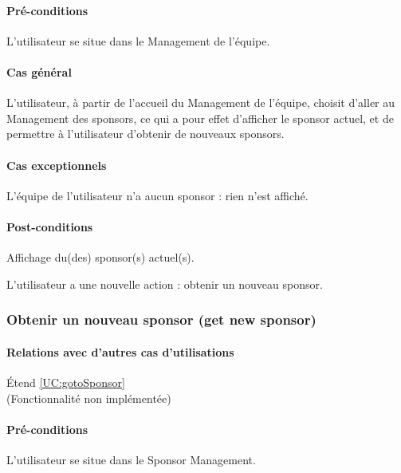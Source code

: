\paragraph{Pré-conditions}
\begin{list}{}{\leftmargin=1.5em}
\item{L'utilisateur se situe dans le Management de l'équipe.}
\end{list}
\paragraph{Cas général}
L'utilisateur, à partir de l'accueil du Management de l'équipe, choisit d'aller au Management des sponsors, ce qui a pour effet d'afficher le sponsor actuel, et de permettre à l'utilisateur d'obtenir de nouveaux sponsors. 
\paragraph{Cas exceptionnels}
L'équipe de l'utilisateur n'a aucun sponsor : rien n'est affiché. 
\paragraph{Post-conditions}
\begin{list}{}{\leftmargin=1.5em}
\item{Affichage du(des) sponsor(s) actuel(s).}
\item{L'utilisateur a une nouvelle action : obtenir un nouveau sponsor.}
\end{list}

\subsubsection{Obtenir un nouveau sponsor (get new sponsor)}
\label{UC:getNewSponsor}
\paragraph{Relations avec d'autres cas d'utilisations}
Étend \ref{UC:gotoSponsor}
\\(Fonctionnalité non implémentée)
\paragraph{Pré-conditions}
\begin{list}{}{\leftmargin=1.5em}
\item{L'utilisateur se situe dans le Sponsor Management.}
\end{list}
